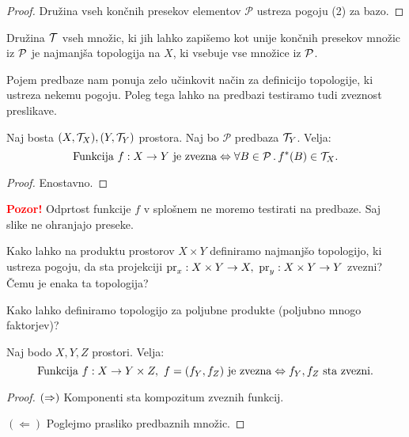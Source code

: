 \begin{proof}
    Družina vseh končnih presekov elementov $\mathcal{P}$ ustreza pogoju (2) za bazo.
\end{proof}

\begin{opomba}
    Družina $\mathcal{T}$ vseh množic, ki jih lahko zapišemo kot unije končnih presekov množic iz $\mathcal{P}$ je najmanjša topologija na $X$, ki vsebuje vse množice iz $\mathcal{P}$.
\end{opomba}

Pojem predbaze nam ponuja zelo učinkovit način za definicijo topologije, ki ustreza nekemu pogoju. Poleg tega lahko na predbazi testiramo tudi zveznost preslikave.

\begin{trditev}
    Naj bosta $(X, \mathcal{T}_X), (Y, \mathcal{T}_Y)$ prostora. Naj bo $\mathcal{P}$ predbaza $\mathcal{T}_Y$. Velja:
    $$\text{Funkcija } f: X \to Y \text{ je zvezna} \Leftrightarrow \forall B \in \mathcal{P} \,.\, f^{*}(B) \in \mathcal{T}_X.$$
\end{trditev}

\begin{proof}
    Enostavno.
\end{proof}


\textbf{\textcolor{red}{Pozor!}} Odprtost funkcije $f$ v splošnem ne moremo testirati na predbaze. Saj slike ne ohranjajo preseke.

\begin{primer}
    Kako lahko na produktu prostorov $X \times Y$ definiramo najmanjšo topologijo, ki ustreza pogoju, da sta projekciji $\operatorname{pr}_x: X \times Y \to X, \ \operatorname{pr}_y: X \times Y \to Y$ zvezni? Čemu je enaka ta topologija?
\end{primer}

\begin{primer}
    Kako lahko definiramo topologijo za poljubne produkte (poljubno mnogo faktorjev)?
\end{primer}

\begin{trditev}
    Naj bodo $X, Y, Z$ prostori. Velja:
    $$\text{Funkcija } f:X \to Y \times Z, \ f = (f_Y, f_Z) \text{ je zvezna} \Leftrightarrow f_Y, f_Z \text{ sta zvezni}.$$
\end{trditev}

\begin{proof}
    $(\Rightarrow)$ Komponenti sta kompozitum zveznih funkcij.

    $(\Leftarrow)$ Poglejmo prasliko predbaznih množic.
\end{proof}

